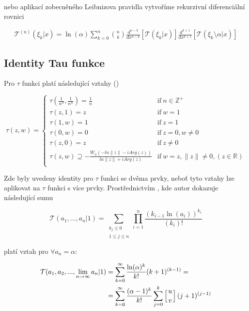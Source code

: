 nebo aplikací zobecněného Leibnizova pravidla 
vytvoříme rekurzivní diferenciální rovnici

\begin{align}
      \mathcal{T}^{(n)}(\xi_k | x) = \ln(\alpha) \sum_{k=0}^n 
      \binom{n}{k} \frac{d^{n-k}}{dx^{n-k}}[\mathcal{T}(\xi_k 
      | x)] \frac{d^{k+1}}{dx^{k+1}}[\mathcal{T}(\xi_k \setminus \alpha| x)] 
\end{align}

\subsection{Identity Tau funkce}

Pro \(\tau\) funkci platí následující vztahy (\cite{19})

\begin{equation}
      \tau(z, w) =\left\{ 
      \begin{array}{ll}
            \tau(\frac{1}{n^n}, \frac{1}{n^n}) = \frac{1}{n}
            &\mbox{if} \  n \in \mathbb{Z}^+\\
            \tau(z, 1) = z &\mbox{if} \  w = 1\\
            \tau(1, w) = 1 & \mbox{if} \ z=1 \\
            \tau(0, w) = 0 & \mbox{if} \ z=0, w \neq 0 \\
            \tau(z, 0) = z & \mbox{if} \ z\neq 0 \\
            \tau(z, w) \supseteq -\frac{W_n(-ln\|z\|-
            iArg(z))}{ln\|z\| + i Arg(z)} & \mbox{if} 
            \ w = z, \|z\| \neq 0,  (z \in \mathbb{R}) \\
      \end{array} 
      \right.
\end{equation}

Zde byly uvedeny identity pro \(\tau\) funkci se dvěma 
prvky, neboť tyto vztahy lze aplikovat na \(\tau\) funkci
s více prvky. Prostřednictvím \cite{24}, kde autor dokazuje
následující sumu

\[\mathcal{T}(a_1, ..., a_n | 1) = \sum_{\substack{k_j \leq 0\\
1 \leq j \leq n}} \prod_{i = 1}^n \frac{(k_{i-1}\ln(a_i))^{k_i}}{(k_i)!}\]

platí vztah pro \(\forall a_n = \alpha\):

\begin{align}
      \mathcal{T}(a_1, a_2, ..., \lim_{n \to \infty} a_n | 
      1) &= \sum_{k=0}^{\infty}\frac{\ln(\alpha)^k}{k!}(k+1)^{(k-1)} 
      = \\ &= \sum_{k=0}^{\infty} \frac{(\alpha- 1)^k}{k!}\sum_{j=0}^k
      \left[ {u \atop v} \right]  (j + 1)^{(j-1)}
\label{PNG1}
\end{align}


